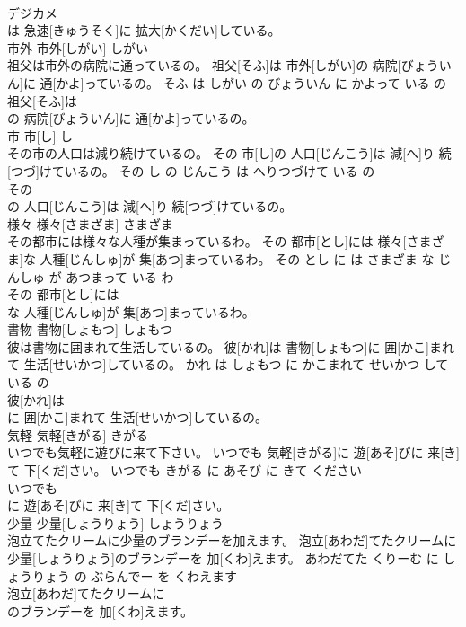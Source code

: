 \documentclass[8pt]{extreport}
\begin{document}
\begin{CJK}{UTF8}{min}
\\	デジカメ
\\	は 急速[きゅうそく]に 拡大[かくだい]している。			
\\	市外	市外[しがい]	しがい	
\\	祖父は市外の病院に通っているの。	祖父[そふ]は 市外[しがい]の 病院[びょういん]に 通[かよ]っているの。	そふ は しがい の びょういん に かよって いる の	
\\	祖父[そふ]は
\\	の 病院[びょういん]に 通[かよ]っているの。			
\\	市	市[し]	し	
\\	その市の人口は減り続けているの。	その 市[し]の 人口[じんこう]は 減[へ]り 続[つづ]けているの。	その し の じんこう は へりつづけて いる の	
\\	その
\\	の 人口[じんこう]は 減[へ]り 続[つづ]けているの。			
\\	様々	様々[さまざま]	さまざま	
\\	その都市には様々な人種が集まっているわ。	その 都市[とし]には 様々[さまざま]な 人種[じんしゅ]が 集[あつ]まっているわ。	その とし に は さまざま な じんしゅ が あつまって いる わ	
\\	その 都市[とし]には
\\	な 人種[じんしゅ]が 集[あつ]まっているわ。			
\\	書物	書物[しょもつ]	しょもつ	
\\	彼は書物に囲まれて生活しているの。	彼[かれ]は 書物[しょもつ]に 囲[かこ]まれて 生活[せいかつ]しているの。	かれ は しょもつ に かこまれて せいかつ して いる の	
\\	彼[かれ]は
\\	に 囲[かこ]まれて 生活[せいかつ]しているの。			
\\	気軽	気軽[きがる]	きがる	
\\	いつでも気軽に遊びに来て下さい。	いつでも 気軽[きがる]に 遊[あそ]びに 来[き]て 下[くだ]さい。	いつでも きがる に あそび に きて ください	
\\	いつでも
\\	に 遊[あそ]びに 来[き]て 下[くだ]さい。			
\\	少量	少量[しょうりょう]	しょうりょう	
\\	泡立てたクリームに少量のブランデーを加えます。	泡立[あわだ]てたクリームに 少量[しょうりょう]のブランデーを 加[くわ]えます。	あわだてた くりーむ に しょうりょう の ぶらんでー を くわえます	
\\	泡立[あわだ]てたクリームに
\\	のブランデーを 加[くわ]えます。			

\end{CJK}
\end{document}
